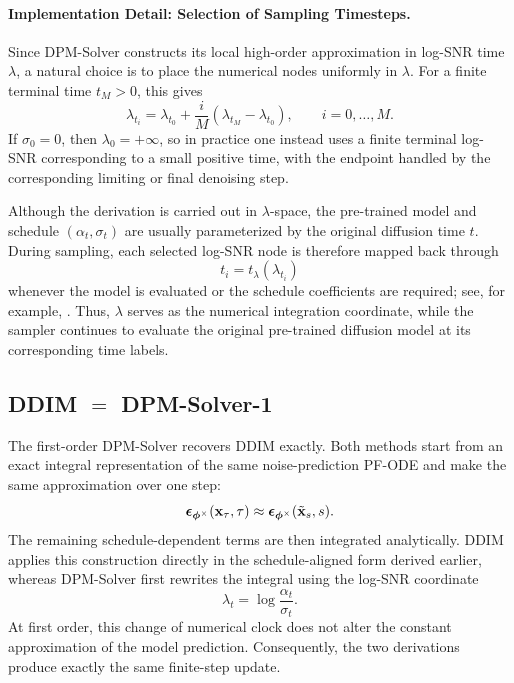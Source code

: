 \paragraph{Implementation Detail: Selection of Sampling Timesteps.}
Since DPM-Solver constructs its local high-order approximation in log-SNR time
$\lambda$, a natural choice is to place the numerical nodes uniformly in
$\lambda$. For a finite terminal time $t_M>0$, this gives
\[
\lambda_{t_i}
=
\lambda_{t_0}
+
\frac{i}{M}
\left(
\lambda_{t_M}-\lambda_{t_0}
\right),
\qquad
i=0,\ldots,M.
\]
If $\sigma_0=0$, then $\lambda_0=+\infty$, so in practice one instead uses a
finite terminal log-SNR corresponding to a small positive time, with the
endpoint handled by the corresponding limiting or final denoising step.


Although the derivation is carried out in $\lambda$-space, the pre-trained
model and schedule $(\alpha_t,\sigma_t)$ are usually parameterized by the
original diffusion time $t$. During sampling, each selected log-SNR node is
therefore mapped back through
\[
t_i=t_\lambda(\lambda_{t_i})
\]
whenever the model is evaluated or the schedule coefficients are required;
see, for example, . Thus, $\lambda$ serves as the
numerical integration coordinate, while the sampler continues to evaluate
the original pre-trained diffusion model at its corresponding time labels.



\subsection{DDIM $=$ DPM-Solver-1}
\label{subsec:ddim=dpm-solver-1}

The first-order DPM-Solver recovers DDIM exactly. Both methods start from an
exact integral representation of the same noise-prediction PF-ODE and make
the same approximation over one step:
\[
{\bm{\epsilon}}_{\bm{\phi}^\times}({\mathbf{x}}_\tau,\tau)
\approx
{\bm{\epsilon}}_{\bm{\phi}^\times}(\tilde{{\mathbf{x}}}_s,s).
\]
The remaining schedule-dependent terms are then integrated analytically.
DDIM applies this construction directly in the schedule-aligned form derived
earlier, whereas DPM-Solver first rewrites the integral using the log-SNR
coordinate
\[
\lambda_t
=
\log\frac{\alpha_t}{\sigma_t}.
\]
At first order, this change of numerical clock does not alter the constant
approximation of the model prediction. Consequently, the two derivations
produce exactly the same finite-step update.

